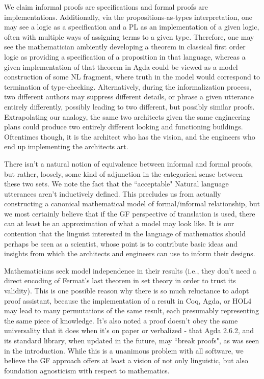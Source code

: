 We claim informal proofs are specifications and formal proofs are
implementations. Additionally, via the propositions-as-types interpretation, one
may see a logic as a specification and a PL as an implementation of a given
logic, often with multiple ways of assigning terms to a given type. Therefore,
one may see the mathematician ambiently developing a theorem in classical first
order logic as providing a specification of a proposition in that language,
whereas a given implementation of that theorem in Agda could be viewed as a
model construction of some NL fragment, where truth in the model would
correspond to termination of type-checking. Alternatively, during the
informalization process, two different authors may suppress different details,
or phrase a given utterance entirely differently, possibly leading to two
different, but possibly similar proofs. Extrapolating our analogy, the same 
two architects given the same engineering plans could produce two entirely
different looking and functioning buildings.  Oftentimes though, it is the
architect who has the vision, and the engineers who end up implementing the
architects art.

There isn't a natural notion of equivalence between informal and formal proofs,
but rather, loosely, some kind of adjunction in the categorical sense between
these two sets. We note the fact that the ``acceptable" Natural language
utterances aren't inductively defined. This precludes us from actually
constructing a canonical mathematical model of formal/informal relationship, but
we most certainly believe that if the GF perspective of translation is used,
there can at least be an approximation of what a model may look like. It is our
contention that the linguist interested in the language of mathematics should
perhaps be seen as a scientist, whose point is to contribute basic ideas and
insights from which the architects and engineers can use to inform their
designs.



Mathematicians seek model independence in their results (i.e., they don't need a
direct encoding of Fermat's last theorem in set theory in order to trust its
validity). This is one possible reason why there is so much reluctance to adopt
proof assistant, because the implementation of a result in Coq, Agda, or HOL4
may lead to many permutations of the same result, each presumably representing
the same piece of knowledge. It's also noted a proof doesn't obey the same
universality that it does when it's on paper or verbalized - that Agda 2.6.2,
and its standard library, when updated in the future, may ``break proofs", as
was seen in the introduction. While this is a unanimous problem with all
software, we believe the GF approach offers at least a vision of not only
linguistic, but also foundation agnosticism with respect to mathematics.

